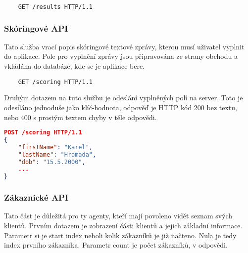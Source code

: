 \documentclass[11pt,twoside,a4paper]{book}
\begin{document}
\begin{minipage}{\linewidth}
\begin{verbatim}
	GET /results HTTP/1.1
\end{verbatim}


\end{minipage}

\subsubsection{Skóringové API} \label{sec:scoringAPI}
Tato služba vrací popis skóringové textové zprávy, kterou musí uživatel vyplnit do aplikace. Pole pro vyplnění zprávy jsou připravována ze strany obchodu a vkládána do databáze, kde se je aplikace bere.

\begin{minipage}{\linewidth}
\begin{verbatim}
	GET /scoring HTTP/1.1
\end{verbatim}


\end{minipage}

Druhým dotazem na tuto službu je odeslání vyplněných polí na server. Toto je odesíláno jednoduše jako klíč-hodnota, odpověď je HTTP kód 200 bez textu, nebo 400 s prostým textem chyby v těle odpovědi.

\begin{minipage}{\linewidth}
\begin{lstlisting}[caption={Příklad požadavku odeslání skóringu},language=json]
POST /scoring HTTP/1.1
{
	"firstName": "Karel",
	"lastName": "Hromada",
	"dob": "15.5.2000",
	... 
}
\end{lstlisting}
\end{minipage}

\subsubsection{Zákaznické API} \label{sec:customersAPI}
Tato část je důležitá pro ty agenty, kteří mají povoleno vidět seznam svých klientů. Prvním dotazem je zobrazení části klientů a jejich základní informace. Parametr si je start index neboli kolik zákazníků je již načteno. Nula je tedy index prvního zákazníka. Parametr count je počet zákazníků, v odpovědi.
\end{document}
